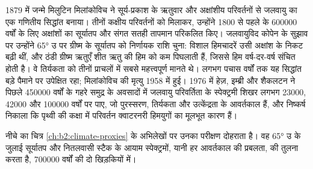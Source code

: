 \begin{history}[पैंसठ अंश उत्तर पर धूप]
1879 में जन्मे मिलुटिन मिलांकोविच ने सूर्य-प्रकाश के ऋतुवार और अक्षांशीय परिवर्तनों से जलवायु का एक गणितीय सिद्धांत बनाया। तीनों कक्षीय परिवर्तनों को मिलाकर,
उन्होंने 1800 से पहले के \num{600000} वर्षों के लिए अक्षांशों का सूर्यातप और संगत सतही तापमान
परिकलित किए। जलवायुविद कोपेन के सुझाव पर उन्होंने \ang{65} उ पर ग्रीष्म के
सूर्यातप को निर्णायक राशि चुना: विशाल हिमचादरें उसी अक्षांश के निकट
बढ़ी थीं, और ठंडी ग्रीष्म ऋतुएँ शीत ऋतु की हिम को कम पिघलाती हैं, जिससे हिम वर्ष-दर-वर्ष
संचित होती है। वे तिर्यकता को तीनों प्राचलों में सबसे महत्त्वपूर्ण मानते थे। लगभग पचास वर्षों तक
यह सिद्धांत बड़े पैमाने पर उपेक्षित रहा; मिलांकोविच की मृत्यु 1958 में हुई। 1976 में हेज़, इम्ब्री और शैकलटन
ने पिछले \num{450000} वर्षों के गहरे समुद्र के अवसादों में जलवायु परिवर्तिता के स्पेक्ट्रमी शिखर
लगभग \num{23000}, \num{42000} और \num{100000} वर्षों पर पाए, जो पुरस्सरण, तिर्यकता और
उत्केंद्रता के आवर्तकाल हैं, और निष्कर्ष निकाला कि पृथ्वी की कक्षा में परिवर्तन क्वाटरनरी हिमयुगों का
मूलभूत कारण हैं।
\end{history}

नीचे का चित्र \cref{ch:b2:climate-proxies} के अभिलेखों पर उनका परीक्षण दोहराता है। वह \ang{65} उ के
जुलाई सूर्यातप और नितलवासी स्टैक के आयाम स्पेक्ट्रमों, यानी हर आवर्तकाल की प्रबलता, की तुलना करता है,
\num{700000} वर्षों की दो खिड़कियों में।

